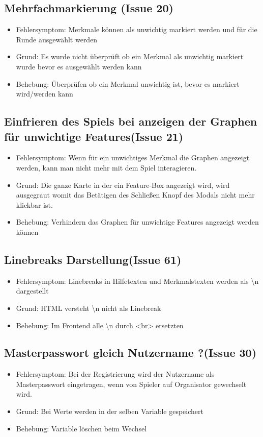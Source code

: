 \documentclass[a4paper]{scrreprt}
\begin{document}
    \subsection{Mehrfachmarkierung (Issue 20)}
    \begin{itemize}
        \item Fehlersymptom: Merkmale können als unwichtig markiert werden und für die Runde ausgewählt werden
        \item Grund: Es wurde nicht überprüft ob ein Merkmal als unwichtig markiert wurde bevor es ausgewählt werden kann
        \item Behebung: Überprüfen ob ein Merkmal unwichtig ist, bevor es markiert wird/werden kann
    \end{itemize}
    \subsection{Einfrieren des Spiels bei anzeigen der Graphen für unwichtige Features(Issue 21)}
    \begin{itemize}
        \item Fehlersymptom: Wenn für ein unwichtiges Merkmal die Graphen angezeigt werden, kann man nicht mehr mit dem Spiel interagieren.
        \item Grund: Die ganze Karte in der ein Feature-Box angezeigt wird, wird ausgegraut womit das Betätigen des Schließen Knopf des Modals nicht mehr klickbar ist.
        \item Behebung: Verhindern das Graphen für unwichtige Features angezeigt werden können
    \end{itemize}
    \subsection{Linebreaks Darstellung(Issue 61)}
    \begin{itemize}
        \item Fehlersymptom: Linebreaks in Hilfetexten und Merkmalstexten werden als \textbackslash n dargestellt
        \item Grund: HTML versteht \textbackslash n nicht als Linebreak
        \item Behebung: Im Frontend alle \textbackslash n durch <br> ersetzten
    \end{itemize}
    \subsection{Masterpasswort gleich Nutzername ?(Issue 30)}
    \begin{itemize}
        \item Fehlersymptom: Bei der Registrierung wird der Nutzername als Masterpasswort eingetragen, wenn von Spieler auf Organisator gewechselt wird.
        \item Grund: Bei Werte werden in der selben Variable gespeichert
        \item Behebung: Variable löschen beim Wechsel
    \end{itemize}
\end{document}
